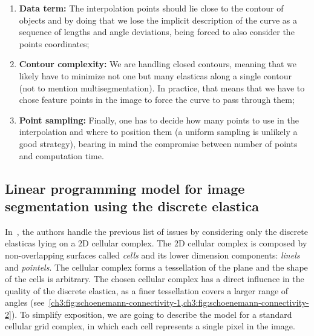\begin{enumerate}
	\item{\textbf{Data term:} The interpolation points should lie close to the contour of objects and by doing that we lose the implicit description of the curve as a sequence of lengths and angle deviations, being forced to also consider the points coordinates;}
	\item{\textbf{Contour complexity:} We are handling closed contours, meaning that we likely have to minimize not one but many elasticas along a single contour (not to mention multisegmentation). In practice, that means that we have to chose feature points in the image to force the curve to pass through them;}
	\item{\textbf{Point sampling:} Finally, one has to decide how many points to use in the interpolation and where to position them (a uniform sampling is unlikely a good strategy), bearing in mind the compromise between number of points and computation time.}
\end{enumerate}




\subsection{Linear programming model for image segmentation using the discrete elastica}

In~\cite{schoenemann09linear}, the authors handle the previous list of issues by considering only the discrete elasticas lying on a $2$D cellular complex. The $2$D cellular complex is composed by non-overlapping surfaces called \emph{cells} and its lower dimension components: \emph{linels} and \emph{pointels}. The cellular complex forms a tessellation of the plane and the shape of the cells is arbitrary. The chosen cellular complex has a direct influence in the quality of the discrete elastica, as a finer tessellation covers a larger range of angles (see~\cref{ch3:fig:schoenemann-connectivity-1,ch3:fig:schoenemann-connectivity-2}). To simplify exposition, we are going to describe the model for a standard cellular grid complex, in which each cell represents a single pixel in the image.


